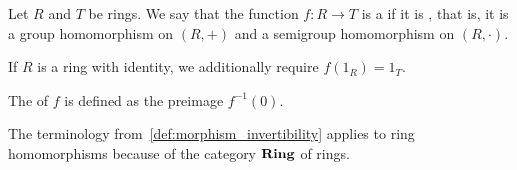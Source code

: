 \begin{definition}\label{def:ring_homomorphism}
  Let \( R \) and \( T \) be rings. We say that the function \( f: R \to T \) is a  if it is , that is, it is a group homomorphism on \( (R, +) \) and a semigroup homomorphism on \( (R, \cdot) \).

  If \( R \) is a ring with identity, we additionally require \( f(1_R) = 1_T \).

  The  of \( f \) is defined as the preimage \( f^{-1}(0) \).

  The terminology from~\cref{def:morphism_invertibility} applies to ring homomorphisms because of the category \( \operatorname{\mathbf{Ring}} \) of rings.
\end{definition}

